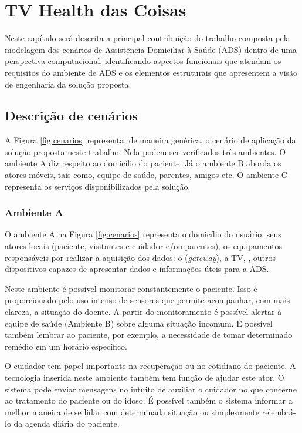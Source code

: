 \chapter{TV Health das Coisas}\label{cap:quatro}

Neste capítulo será descrita a principal contribuição do trabalho composta pela
modelagem dos cenários de Assistência Domiciliar à Saúde (ADS) dentro de uma
perspectiva computacional, identificando aspectos funcionais que atendam os
requisitos do ambiente de ADS e os elementos estruturais que apresentem a visão
de engenharia da solução proposta.

\section{Descrição de cenários}

A Figura \ref{fig:cenarios} representa, de maneira genérica, o cenário de
aplicação da solução proposta neste trabalho. Nela podem ser verificados três
ambientes. O ambiente A diz respeito ao domicílio do paciente. Já o ambiente B
aborda os atores móveis, tais como, equipe de saúde, parentes, amigos etc.  O
ambiente C representa os serviços disponibilizados pela solução.


\subsection{Ambiente A} \label{subsec:ambiente-a}

O ambiente A na Figura \ref{fig:cenarios} representa o domicílio do usuário, seus atores locais (paciente,
visitantes e cuidador e/ou parentes), os equipamentos responsáveis por  realizar
a aquisição dos dados: o \stb[] (\textit{gateway}), a TV, \smartphones[], outros
dispositivos capazes de apresentar dados e informações úteis para a ADS.

Neste ambiente é possível monitorar constantemente o paciente. Isso é
proporcionado pelo uso intenso de sensores que permite acompanhar, com mais
clareza, a situação do doente. A partir do monitoramento é possível alertar à
equipe de saúde (Ambiente B) sobre alguma situação incomum. É possível também
lembrar ao paciente, por exemplo, a necessidade de tomar determinado remédio em
um horário específico.

O cuidador tem papel importante na recuperação ou no cotidiano do 
paciente. A tecnologia inserida neste ambiente também tem função de ajudar
este ator. O sistema pode enviar mensagens no intuito de auxiliar o cuidador no
que concerne ao tratamento do paciente ou do idoso. É possível também o sistema
informar a melhor maneira de se lidar com determinada situação ou simplesmente 
relembrá-lo da agenda diária do paciente.

